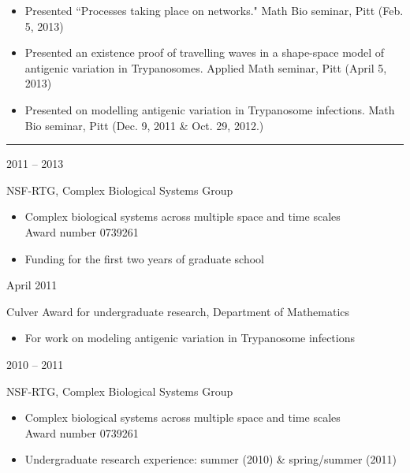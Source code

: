 \documentclass[a4paper,10pt]{article}
\newlength{\cvcolumngapwidth}
\newlength{\cvleftcolumnwidth}
\newlength{\cvrightcolumnwidth}
\newcommand{\cvsectionstyle}[1]{{\normalsize\cvsectionfont\textcolor{cvsectioncolor}{#1}}}
\newcommand{\cvtitlestyle}[1]{{\large\cvtitlefont\textcolor{cvtitlecolor}{#1}}}
\newcommand{\cvheadingstyle}[1]{{\normalsize\cvheadingfont\textcolor{cvheadingcolor}{#1}}}
\newlength{\cvafteritemskipamount}
\newlength{\cvaftersectionskipamount}
\newlength{\cvbetweensectionandheadingextraskipamount}
\newlength{\cvaftertitleskipamount}
\newlength{\cvparskip}
\newcommand{\cvsection}[1]{
    \begin{minipage}[t]{\cvleftcolumnwidth}
        \raggedleft\cvsectionstyle{#1}
    \end{minipage}%
    \hspace{\cvcolumngapwidth}%
    \begin{minipage}[t]{\cvrightcolumnwidth}
        \textcolor{cvrulecolor}{\rule{\cvrightcolumnwidth}{0.3mm}}
    \end{minipage}

    \vspace{\cvaftersectionskipamount}
}
\newcommand{\cvitem}[2]{
    \begin{minipage}[t]{\cvleftcolumnwidth}
        \raggedleft #1
    \end{minipage}%
    \hspace{\cvcolumngapwidth}%
    \begin{minipage}[t]{\cvrightcolumnwidth}
        \setlength{\parskip}{\cvparskip} #2
    \end{minipage}

    \vspace{\cvafteritemskipamount}
}
\newcommand{\cvtitle}[1]{
    \cvtitlestyle{#1}

    \vspace{\cvaftertitleskipamount}
    \vspace{-\cvparskip}
}
\begin{document}
{\begin{itemize}[leftmargin=*]
        \item Presented ``Processes taking place on networks." Math Bio seminar, Pitt (Feb. 5, 2013) \\
        \item Presented an existence proof of travelling waves in a shape-space model of antigenic variation in Trypanosomes. Applied Math seminar, Pitt (April 5, 2013) \\
        \item Presented on modelling antigenic variation in Trypanosome infections. Math Bio seminar, Pitt (Dec. 9, 2011 \& Oct. 29, 2012.) \\
    \end{itemize}

}


\cvsection{AWARDS \& FELLOWSHIPS}
\vspace{\cvbetweensectionandheadingextraskipamount}

\cvitem{
    \cvheadingstyle{2011 -- 2013}
}{
     \cvtitle{NSF-RTG, Complex Biological Systems Group}
    \begin{itemize}[leftmargin=*]

        \item Complex biological systems across multiple space and time scales \\ Award number 0739261
        \item Funding for the first two years of graduate school
    \end{itemize}
    
}


\cvitem{
    \cvheadingstyle{April 2011}
}{
    \cvtitle{Culver Award for undergraduate research, Department of Mathematics}
    \begin{itemize}[leftmargin=*]
	\item For work on modeling antigenic variation in Trypanosome infections
    \end{itemize}
    
}


\cvitem{
    \cvheadingstyle{2010 -- 2011}
}{
     \cvtitle{NSF-RTG, Complex Biological Systems Group}
    \begin{itemize}[leftmargin=*]

        \item Complex biological systems across multiple space and time scales \\ Award number 0739261
        \item Undergraduate research experience: summer (2010) \& spring/summer (2011)
    \end{itemize}
    
}
\end{document}
